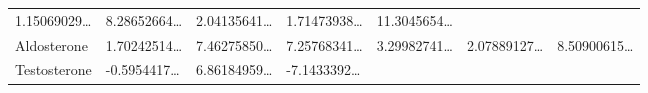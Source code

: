 \documentclass[
]{article}
\begin{document}
\begin{longtable}[]{@{}lllllll@{}}
\begin{minipage}[t]{0.12\columnwidth}
1.15069029\ldots{}\strut
\end{minipage} & \begin{minipage}[t]{0.12\columnwidth}\raggedright
8.28652664\ldots{}\strut
\end{minipage} & \begin{minipage}[t]{0.12\columnwidth}\raggedright
2.04135641\ldots{}\strut
\end{minipage} & \begin{minipage}[t]{0.12\columnwidth}\raggedright
1.71473938\ldots{}\strut
\end{minipage} & \begin{minipage}[t]{0.12\columnwidth}\raggedright
11.3045654\ldots{}\strut
\end{minipage}\tabularnewline
\begin{minipage}[t]{0.12\columnwidth}\raggedright
Aldosterone\strut
\end{minipage} & \begin{minipage}[t]{0.12\columnwidth}\raggedright
1.70242514\ldots{}\strut
\end{minipage} & \begin{minipage}[t]{0.12\columnwidth}\raggedright
7.46275850\ldots{}\strut
\end{minipage} & \begin{minipage}[t]{0.12\columnwidth}\raggedright
7.25768341\ldots{}\strut
\end{minipage} & \begin{minipage}[t]{0.12\columnwidth}\raggedright
3.29982741\ldots{}\strut
\end{minipage} & \begin{minipage}[t]{0.12\columnwidth}\raggedright
2.07889127\ldots{}\strut
\end{minipage} & \begin{minipage}[t]{0.12\columnwidth}\raggedright
8.50900615\ldots{}\strut
\end{minipage}\tabularnewline
\begin{minipage}[t]{0.12\columnwidth}\raggedright
Testosterone\strut
\end{minipage} & \begin{minipage}[t]{0.12\columnwidth}\raggedright
-0.5954417\ldots{}\strut
\end{minipage} & \begin{minipage}[t]{0.12\columnwidth}\raggedright
6.86184959\ldots{}\strut
\end{minipage} & \begin{minipage}[t]{0.12\columnwidth}\raggedright
-7.1433392\ldots{}\strut

\end{minipage}
\end{longtable}
\end{document}
